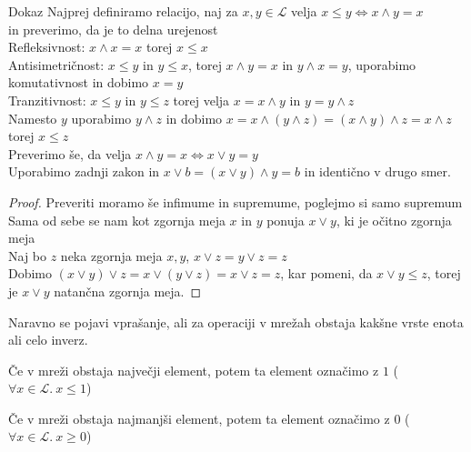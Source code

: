 \documentclass{beamer}
\begin{document}
\begin{frame}

\begin{block}{Dokaz}
Najprej definiramo relacijo, naj za $x,y \in \mathcal{L}$ velja $x \leq y \iff x \land y = x$\\ in preverimo, da je to delna urejenost \\ \pause
Refleksivnost: \pause$x \land x = x$ torej $x \leq x$\\ \pause
Antisimetričnost: \pause $x \leq y$ in $y \leq x$, torej $x \land y = x$ in $y \land x = y$, uporabimo komutativnost in dobimo $x = y$\\ \pause
Tranzitivnost: \pause $x \leq y$ in $y \leq z$ torej velja $x = x \land y$ in $y = y \land z$ \\ \pause
Namesto $y$ uporabimo $y \land z$ in dobimo $x = x \land (y \land z) = (x \land y) \land z = x \land z$ torej \pause $x \leq z$ \\ \pause
Preverimo še, da velja $x \land y = x \iff x \lor y = y$\\ \pause
Uporabimo zadnji zakon in $x \lor b = (x \lor y) \land y = b$ in identično v drugo smer.

\end{block}

\end{frame}


\begin{frame}
\begin{proof}
Preveriti moramo še infimume in supremume\pause, poglejmo si samo supremum\\ \pause
Sama od sebe se nam kot zgornja meja $x$ in $y$ ponuja $x \lor y$, ki je očitno zgornja meja \\ \pause%
Naj bo $z$ neka zgornja meja $x,y$, $x \lor z = y \lor z = z$\\ \pause
Dobimo $(x \lor y) \lor z = x \lor (y \lor z) = x \lor z = z$, kar pomeni, da $x \lor y \leq z$, torej je $x \lor y$ natančna zgornja meja. 
\end{proof}
\end{frame}

\begin{frame}

\begin{block}{}
Naravno se pojavi vprašanje, ali za operaciji v mrežah obstaja kakšne vrste enota ali celo inverz.
\end{block}

\begin{definition}
Če v mreži obstaja največji element, potem ta element označimo z $1$ ($\forall x \in \mathcal{L}. \ x \leq 1$)
\end{definition}

\begin{definition}
Če v mreži obstaja najmanjši element, potem ta element označimo z $0$ ($\forall x \in \mathcal{L}. \ x \geq 0$)
\end{definition}

\end{frame}
\end{document}
